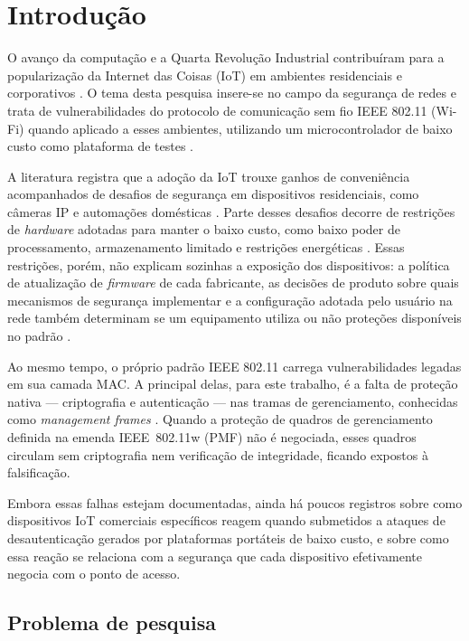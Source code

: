 \chapter{Introdução}

O avanço da computação e a Quarta Revolução Industrial contribuíram para a popularização da Internet das Coisas (IoT) em ambientes residenciais e corporativos \cite{James2023}. O tema desta pesquisa insere-se no campo da segurança de redes e trata de vulnerabilidades do protocolo de comunicação sem fio IEEE 802.11 (Wi-Fi) quando aplicado a esses ambientes, utilizando um microcontrolador de baixo custo como plataforma de testes \cite{KristiyantoErnastuti2020}.

A literatura registra que a adoção da IoT trouxe ganhos de conveniência acompanhados de desafios de segurança em dispositivos residenciais, como câmeras IP e automações domésticas \cite{KristiyantoErnastuti2020}. Parte desses desafios decorre de restrições de \textit{hardware} adotadas para manter o baixo custo, como baixo poder de processamento, armazenamento limitado e restrições energéticas \cite{FarhadPyun2022}. Essas restrições, porém, não explicam sozinhas a exposição dos dispositivos: a política de atualização de \textit{firmware} de cada fabricante, as decisões de produto sobre quais mecanismos de segurança implementar e a configuração adotada pelo usuário na rede também determinam se um equipamento utiliza ou não proteções disponíveis no padrão \cite{Lima2025}.

Ao mesmo tempo, o próprio padrão IEEE 802.11 carrega vulnerabilidades legadas em sua camada MAC. A principal delas, para este trabalho, é a falta de proteção nativa --- criptografia e autenticação --- nas tramas de gerenciamento, conhecidas como \textit{management frames} \cite{KohliosHayajneh2018}. Quando a proteção de quadros de gerenciamento definida na emenda IEEE~802.11w (PMF) não é negociada, esses quadros circulam sem criptografia nem verificação de integridade, ficando expostos à falsificação.

Embora essas falhas estejam documentadas, ainda há poucos registros sobre como dispositivos IoT comerciais específicos reagem quando submetidos a ataques de desautenticação gerados por plataformas portáteis de baixo custo, e sobre como essa reação se relaciona com a segurança que cada dispositivo efetivamente negocia com o ponto de acesso.

\section{Problema de pesquisa}
\label{sec:problema}


